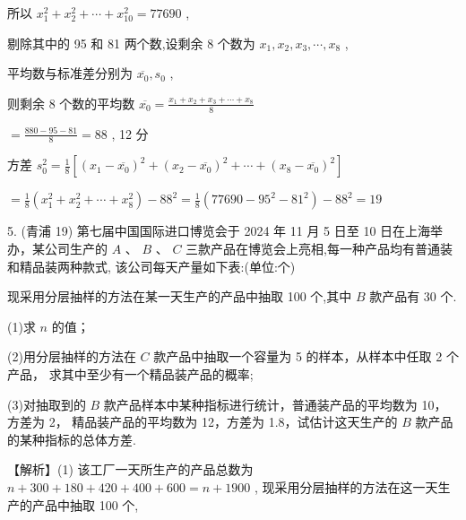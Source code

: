 \documentclass[10pt]{article}
\begin{document}
所以 \({x}_{1}^{2} + {x}_{2}^{2} + \cdots  + {x}_{10}^{2} = {77690}\) ,

剔除其中的 95 和 81 两个数,设剩余 8 个数为 \({x}_{1},{x}_{2},{x}_{3},\cdots ,{x}_{8}\) ,

平均数与标准差分别为 \(\overline{{x}_{0}},{s}_{0}\) ,

则剩余 8 个数的平均数 \(\overline{{x}_{0}} = \frac{{x}_{1} + {x}_{2} + {x}_{3} + \cdots  + {x}_{8}}{8}\)

\(= \frac{{880} - {95} - {81}}{8} = {88}\) , 12 分

方差 \({s}_{0}^{2} = \frac{1}{8}\left\lbrack  {{\left( {x}_{1} - \overline{{x}_{0}}\right) }^{2} + {\left( {x}_{2} - \overline{{x}_{0}}\right) }^{2} + \cdots  + {\left( {x}_{8} - \overline{{x}_{0}}\right) }^{2}}\right\rbrack\)

\(= \frac{1}{8}\left( {{x}_{1}^{2} + {x}_{2}^{2} + \cdots  + {x}_{8}^{2}}\right)  - {88}^{2} = \frac{1}{8}\left( {{77690} - {95}^{2} - {81}^{2}}\right)  - {88}^{2} = {19}\)

5. (青浦 19) 第七届中国国际进口博览会于 2024 年 11 月 5 日至 10 日在上海举办，某公司生产的 \(A\text{ 、 }B\text{ 、 }C\) 三款产品在博览会上亮相,每一种产品均有普通装和精品装两种款式, 该公司每天产量如下表:(单位:个)

\begin{center}
\end{center}

现采用分层抽样的方法在某一天生产的产品中抽取 100 个,其中 \(B\) 款产品有 30 个.

(1)求 \(n\) 的值；

(2)用分层抽样的方法在 \(C\) 款产品中抽取一个容量为 5 的样本，从样本中任取 2 个产品， 求其中至少有一个精品装产品的概率;

(3)对抽取到的 \(B\) 款产品样本中某种指标进行统计，普通装产品的平均数为 10，方差为 2， 精品装产品的平均数为 12，方差为 1.8，试估计这天生产的 \(B\) 款产品的某种指标的总体方差.

【解析】(1) 该工厂一天所生产的产品总数为 \(n + {300} + {180} + {420} + {400} + {600} = n + {1900}\) , 现采用分层抽样的方法在这一天生产的产品中抽取 100 个,
\end{document}
